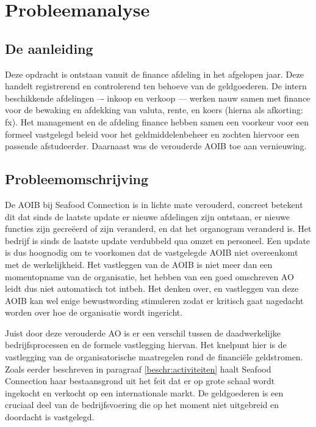\chapter{Probleemanalyse}
\label{hoofdstuk:probleemanalyse}
\section{De aanleiding}
Deze opdracht is ontstaan vanuit de finance afdeling in het afgelopen jaar. Deze handelt registrerend en controlerend ten behoeve van de \gls{geldgoederen}. De intern beschikkende afdelingen –- inkoop en verkoop --– werken nauw samen met finance voor de bewaking en afdekking van \gls{valuta}, \gls{rente}, en \gls{koers} (hierna als afkorting: \gls{fx}). Het management en de afdeling finance hebben samen een voorkeur voor een formeel vastgelegd beleid voor het geldmiddelenbeheer en zochten hiervoor een passende afstudeerder. Daarnaast was de verouderde AOIB toe aan vernieuwing.

\section{Probleemomschrijving}
\label{beschr:problemen}
De AOIB bij Seafood Connection is in lichte mate verouderd, concreet betekent dit dat sinds de laatste update er nieuwe afdelingen zijn ontstaan, er nieuwe functies zijn gecreëerd of zijn veranderd, en dat het organogram veranderd is. Het bedrijf is sinds de laatste update verdubbeld qua omzet en personeel. Een update is dus hoognodig om te voorkomen dat de vastgelegde AOIB niet overeenkomt met de werkelijkheid. 
Het vastleggen van de AOIB is niet meer dan een momentopname van de organisatie, het hebben van een goed omschreven AO leidt dus niet automatisch tot \gls{intbeh}. Het denken over, en vastleggen van deze AOIB kan wel enige bewustwording stimuleren zodat er kritisch gaat nagedacht worden over hoe de organisatie wordt ingericht. \citep{bivpraktijk}

Juist door deze verouderde AO is er een verschil tussen de daadwerkelijke bedrijfsprocessen en de formele vastlegging hiervan. Het knelpunt hier is de vastlegging van de organisatorische maatregelen rond de financiële geldstromen. Zoals eerder beschreven in paragraaf \ref{beschr:activiteiten} haalt Seafood Connection haar bestaansgrond uit het feit dat er op grote schaal wordt ingekocht en verkocht op een internationale markt. De \gls{geldgoederen} is een cruciaal deel van de bedrijfsvoering die op het moment niet uitgebreid en doordacht is vastgelegd. \citep{aoibsfc}

